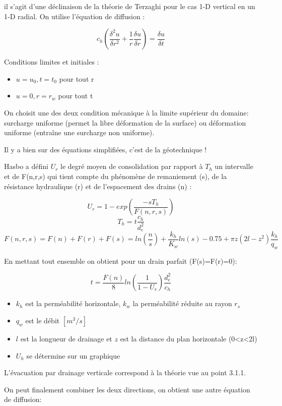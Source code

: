 \medskip

il s'agit d'une déclinaison de la théorie de Terzaghi pour le cas 1-D vertical en un 1-D radial. On utilise l'équation de diffusion :

$$ c_h(\frac{\delta^2 u}{\delta r^2}+\frac{1}{r}\frac{\delta u}{\delta r}) = \frac{\delta u}{\delta t} $$

Conditions limites et initiales : 
\begin{itemize}
    \item $u=u_0, t=t_0$ pour tout r
    \item $u=0, r=r_w$ pour tout t
\end{itemize}

\medskip

On choisit une des deux condition mécanique à la limite supérieur du domaine: surcharge uniforme (permet la libre déformation de la surface) ou déformation uniforme (entraîne une surcharge non uniforme).

Il y a bien sur des équations simplifiées, c'est de la géotechnique ! 

Hasbo a défini $U_r$ le degré moyen de consolidation par rapport à $T_h$ un intervalle et de F(n,r,s) qui tient compte du phénomène de remaniement (s), de la résistance hydraulique (r) et de l'espacement des drains (n) : 

$$U_r = 1-exp(\frac{-sT_h}{F(n,r,s)})$$ 
$$T_h = t\frac{c_h}{d_e^2}$$ 
$$F(n,r,s) = F(n) + F(r) + F(s) = ln(\frac{n}{s})+\frac{k_h}{K_w}ln(s)-0.75+\pi z(2l-z^2)\frac{k_h}{q_w}$$ 

En mettant tout ensemble on obtient pour un drain parfait (F(s)=F(r)=0):

$$t=\frac{F(n)}{8}ln(\frac{1}{1-U_r})\frac{d^2_e}{c_h}$$

\begin{itemize}
    \item $k_h$ est la perméabilité horizontale, $k_w$ la perméabilité réduite au rayon $r_s$
    \item $q_w$ est le débit $[m^3/s]$
    \item $l$ est la longueur de drainage et $z$ est la distance du plan horizontale (0<z<2l)
    \item $U_h$ se détermine sur un graphique
\end{itemize} 

\medskip

L'évacuation par drainage verticale correspond à la théorie vue au point 3.1.1.

On peut finalement combiner les deux directions, on obtient une autre équation de diffusion:

